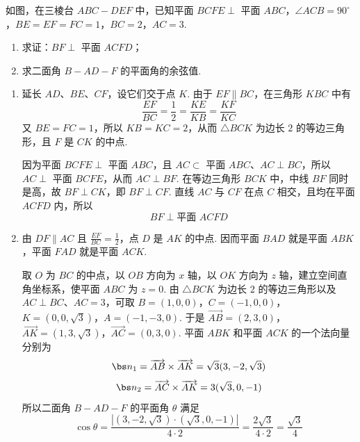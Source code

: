 \begin{problem}
如图，在三棱台 \( ABC-DEF \) 中，已知平面 \( BCFE\perp \) 平面 \(ABC\)，\( \angle ACB=90^\circ \)，\( BE=EF=FC=1 \)，\( BC=2 \)，\( AC=3 \).

\begin{enumerate}
\item 求证：\( BF\perp \) 平面 \(ACFD\)；
\item 求二面角 \( B-AD-F \) 的平面角的余弦值.
\end{enumerate}

\end{problem}

\begin{solution}
\begin{enumerate}
\item 延长 \(AD\)、\(BE\)、\(CF\)，设它们交于点 \(K\). 由于 \(EF\parallel BC\)，在三角形 \(KBC\) 中有
\[
\frac{EF}{BC}=\frac12=\frac{KE}{KB}=\frac{KF}{KC}
\]
又 \(BE=FC=1\)，所以 \(KB=KC=2\)，从而 \(\triangle BCK\) 为边长 \(2\) 的等边三角形，且 \(F\) 是 \(CK\) 的中点.

因为平面 \(BCFE\perp\) 平面 \(ABC\)，且 \(AC\subset\) 平面 \(ABC\)、\(AC\perp BC\)，所以 \(AC\perp\) 平面 \(BCFE\)，从而 \(AC\perp BF\). 在等边三角形 \(BCK\) 中，中线 \(BF\) 同时是高，故 \(BF\perp CK\)，即 \(BF\perp CF\). 直线 \(AC\) 与 \(CF\) 在点 \(C\) 相交，且均在平面 \(ACFD\) 内，所以
\[
BF\perp\text{平面 }ACFD
\]

\item 由 \(DF\parallel AC\) 且 \(\frac{EF}{BC}=\frac{1}{2}\)，点 \(D\) 是 \(AK\) 的中点. 因而平面 \(BAD\) 就是平面 \(ABK\)，平面 \(FAD\) 就是平面 \(ACK\).

取 \(O\) 为 \(BC\) 的中点，以 \(OB\) 方向为 \(x\) 轴，以 \(OK\) 方向为 \(z\) 轴，建立空间直角坐标系，使平面 \(ABC\) 为 \(z=0\). 由 \(\triangle BCK\) 为边长 \(2\) 的等边三角形以及 \(AC\perp BC\)、\(AC=3\)，可取
\(B=(1,0,0)\)，\(C=(-1,0,0)\)，\(K=(0,0,\sqrt3)\)，\(A=(-1,-3,0)\).
于是
\(\overrightarrow{AB}=(2,3,0)\)，\(\overrightarrow{AK}=(1,3,\sqrt3)\)，\(\overrightarrow{AC}=(0,3,0)\).
平面 \(ABK\) 和平面 \(ACK\) 的一个法向量分别为
\[
\bs n_1=\overrightarrow{AB}\times\overrightarrow{AK}
=\sqrt3(3,-2,\sqrt3)
\]
\[
\bs n_2=\overrightarrow{AC}\times\overrightarrow{AK}
=3(\sqrt3,0,-1)
\]
所以二面角 \(B-AD-F\) 的平面角 \(\theta\) 满足
\[
\cos\theta
=\frac{|(3,-2,\sqrt3)\cdot(\sqrt3,0,-1)|}{4\cdot2}
=\frac{2\sqrt3}{4\cdot2}
=\frac{\sqrt3}{4}
\]
\end{enumerate}
\end{solution}

